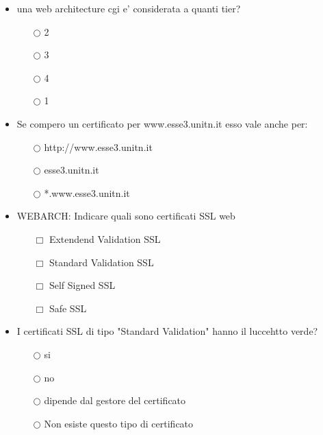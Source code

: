 \documentclass[10pt,twocolumn]{article}
\begin{document}
\begin{itemize}
    \item una web architecture cgi e' considerata a quanti tier?
          \begin{itemize}
              \item[$\bigcirc$] 2
              \item[$\bigcirc$] 3
              \item[$\bigcirc$] 4
              \item[$\bigcirc$] 1
          \end{itemize}
\end{itemize}
\begin{itemize}
    \item Se compero un certificato per www.esse3.unitn.it esso vale anche per:
          \begin{itemize}
              \item[$\bigcirc$] http://www.esse3.unitn.it
              \item[$\bigcirc$] esse3.unitn.it
              \item[$\bigcirc$] *.www.esse3.unitn.it
          \end{itemize}
\end{itemize}
\begin{itemize}
    \item WEBARCH: Indicare quali sono certificati SSL web
          \begin{itemize}
              \item[$\Box$] Extendend Validation SSL
              \item[$\Box$] Standard Validation SSL
              \item[$\Box$] Self Signed SSL
              \item[$\Box$] Safe SSL
          \end{itemize}
\end{itemize}
\begin{itemize}
    \item I certificati SSL di tipo "Standard Validation" hanno il luccehtto verde?
          \begin{itemize}
              \item[$\bigcirc$] si
              \item[$\bigcirc$] no
              \item[$\bigcirc$] dipende dal gestore del certificato
              \item[$\bigcirc$] Non esiste questo tipo di certificato
          \end{itemize}
\end{itemize}
\end{document}
